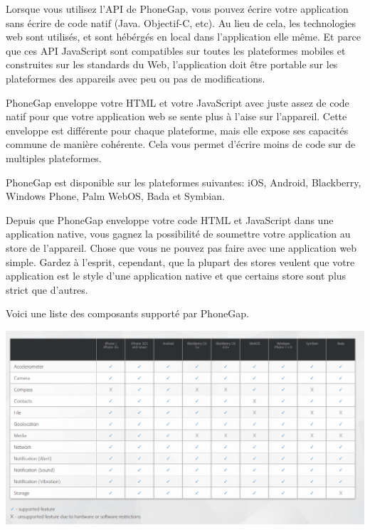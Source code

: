 Lorsque vous utilisez l’API de PhoneGap, vous pouvez écrire votre application sans écrire de code natif (Java. Objectif-C, etc). Au lieu de cela, les technologies web sont utilisés, et sont hébérgés en local dans l’application elle même. Et parce que ces API JavaScript sont compatibles sur toutes les plateformes mobiles et construites sur les standards du Web, l’application doit être portable sur les plateformes des appareils avec peu ou pas de modifications.

PhoneGap enveloppe votre HTML et votre JavaScript avec juste assez de code natif pour que votre application web se sente plus à l’aise sur l’appareil. Cette enveloppe est différente pour chaque plateforme, mais elle expose ses capacités commune de manière cohérente. Cela vous permet d’écrire moins de code sur de multiples plateformes.

PhoneGap est disponible sur les plateformes suivantes: iOS, Android, Blackberry, Windows Phone, Palm WebOS, Bada et Symbian.

Depuis que PhoneGap enveloppe votre code HTML et JavaScript dans une application native, vous gagnez la possibilité de soumettre votre application au store de l’appareil. Chose que vous ne pouvez pas faire avec une application web simple. Gardez à l’esprit, cependant, que la plupart des stores veulent que votre application est le style d’une application native et que certains store sont plus strict que d’autres.

Voici une liste des composants supporté par PhoneGap.

\begin{center}
\includegraphics[width=14cm]{img/phonegapFeatures.png}
\label{Plateforme Wakanda}
\end{center}